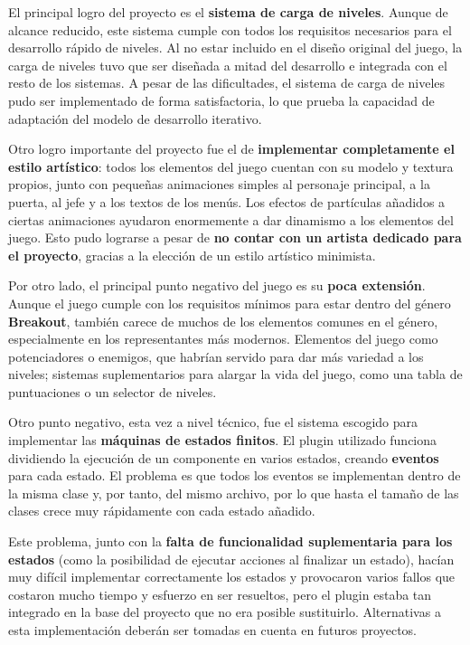 El principal logro del proyecto es el \textbf{sistema de carga de niveles}. Aunque de alcance reducido, este sistema cumple con todos los requisitos necesarios para el desarrollo rápido de niveles. Al no estar incluido en el diseño original del juego, la carga de niveles tuvo que ser diseñada a mitad del desarrollo e integrada con el resto de los sistemas. A pesar de las dificultades, el sistema de carga de niveles pudo ser implementado de forma satisfactoria, lo que prueba la capacidad de adaptación del modelo de desarrollo iterativo.

Otro logro importante del proyecto fue el de \textbf{implementar completamente el estilo artístico}: todos los elementos del juego cuentan con su modelo y textura propios, junto con pequeñas animaciones simples al personaje principal, a la puerta, al jefe y a los textos de los menús. Los efectos de partículas añadidos a ciertas animaciones ayudaron enormemente a dar dinamismo a los elementos del juego. Esto pudo lograrse a pesar de \textbf{no contar con un artista dedicado para el proyecto}, gracias a la elección de un estilo artístico minimista.

Por otro lado, el principal punto negativo del juego es su \textbf{poca extensión}. Aunque el juego cumple con los requisitos mínimos para estar dentro del género \textbf{Breakout}, también carece de muchos de los elementos comunes en el género, especialmente en los representantes más modernos. Elementos del juego como potenciadores o enemigos, que habrían servido para dar más variedad a los niveles; sistemas suplementarios para alargar la vida del juego, como una tabla de puntuaciones o un selector de niveles.

Otro punto negativo, esta vez a nivel técnico, fue el sistema escogido para implementar las \textbf{máquinas de estados finitos}. El plugin utilizado funciona dividiendo la ejecución de un componente en varios estados, creando \textbf{eventos} para cada estado. El problema es que todos los eventos se implementan dentro de la misma clase y, por tanto, del mismo archivo, por lo que hasta el tamaño de las clases crece muy rápidamente con cada estado añadido. 

Este problema, junto con la \textbf{falta de funcionalidad suplementaria para los estados} (como la posibilidad de ejecutar acciones al finalizar un estado), hacían muy difícil implementar correctamente los estados y provocaron varios fallos que costaron mucho tiempo y esfuerzo en ser resueltos, pero el plugin estaba tan integrado en la base del proyecto que no era posible sustituirlo. Alternativas a esta implementación deberán ser tomadas en cuenta en futuros proyectos.

